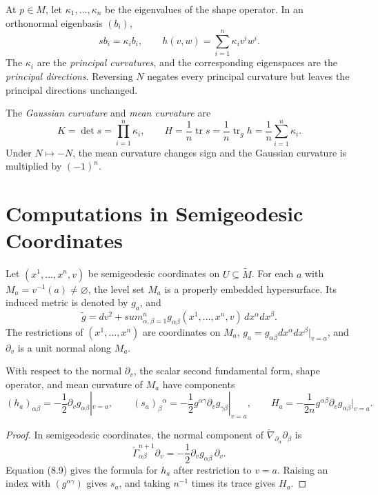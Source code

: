 At $p\in M$, let $\kappa_1,\ldots,\kappa_n$ be the eigenvalues of the shape
operator. In an orthonormal eigenbasis $(b_i)$,
\[
sb_i=\kappa_i b_i,
\qquad
h(v,w)=\sum_{i=1}^n\kappa_i v^iw^i.
\]
The $\kappa_i$ are the \emph{principal curvatures}, and the corresponding
eigenspaces are the \emph{principal directions}. Reversing $N$ negates every
principal curvature but leaves the principal directions unchanged.

The \emph{Gaussian curvature} and \emph{mean curvature} are
\[
K=\det s=\prod_{i=1}^n\kappa_i,
\qquad
H=\frac1n\operatorname{tr}s
=\frac1n\operatorname{tr}_g h
=\frac1n\sum_{i=1}^n\kappa_i.
\]
Under $N\mapsto-N$, the mean curvature changes sign and the Gaussian curvature
is multiplied by $(-1)^n$.

\section{Computations in Semigeodesic Coordinates}

Let $(x^1,\ldots,x^n,v)$ be semigeodesic coordinates on
$U\subseteq\widetilde M$. For each $a$ with
$M_a=v^{-1}(a)\ne\varnothing$, the level set $M_a$ is a properly embedded
hypersurface. Its induced metric is denoted by $g_a$, and
\begin{equation}
\widetilde g=dv^2+sum_{\alpha,\beta=1}^n
g_{\alpha\beta}(x^1,\ldots,x^n,v)\,dx^\alpha dx^\beta. \tag{8.13}
\end{equation}
The restrictions of $(x^1,\ldots,x^n)$ are coordinates on $M_a$,
$g_a=g_{\alpha\beta}dx^\alpha dx^\beta|_{v=a}$, and $\partial_v$ is a unit
normal along $M_a$.

\begin{proposition}
\label{prop:semigeodesic-coordinates-second-form}
With respect to the normal $\partial_v$, the scalar second fundamental form,
shape operator, and mean curvature of $M_a$ have components
\[
(h_a)_{\alpha\beta}
=-\frac12\partial_vg_{\alpha\beta}|_{v=a},
\qquad
(s_a)_\beta{}^\alpha
=-\frac12g^{\alpha\gamma}\partial_vg_{\gamma\beta}|_{v=a},
\qquad
H_a=-\frac1{2n}g^{\alpha\beta}\partial_vg_{\alpha\beta}|_{v=a}.
\]
\end{proposition}

\begin{proof}
\sketch In semigeodesic coordinates, the normal component of
$\widetilde\nabla_{\partial_\alpha}\partial_\beta$ is
\[
\widetilde\Gamma^{n+1}_{\alpha\beta}\partial_v
=-\frac12\partial_vg_{\alpha\beta}\,\partial_v.
\]
Equation (8.9) gives the formula for $h_a$ after restriction to $v=a$.
Raising an index with $(g^{\alpha\gamma})$ gives $s_a$, and taking
$n^{-1}$ times its trace gives $H_a$.
\end{proof}

